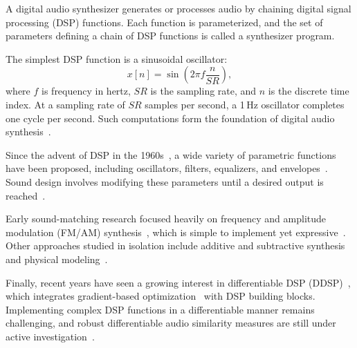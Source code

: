 A digital audio synthesizer generates or processes audio by chaining digital signal processing (\gls{DSP}) functions. 
Each function is parameterized, and the set of parameters defining a chain of DSP functions is called a synthesizer program. 

The simplest DSP function is a sinusoidal oscillator: 
\[
x[n] = \sin\!\left(2 \pi f \frac{n}{SR}\right),
\]
where $f$ is frequency in hertz, $SR$ is the sampling rate, and $n$ is the discrete time index. 
At a sampling rate of $SR$ samples per second, a 1\,Hz oscillator completes one cycle per second. 
Such computations form the foundation of digital audio synthesis~\cite{lyons1997understanding}. 

Since the advent of DSP in the 1960s~\cite{stranneby2004digital}, a wide variety of parametric functions have been proposed, including oscillators, filters, equalizers, and envelopes~\cite{lyons1997understanding,russ1999sound}. 
Sound design involves modifying these parameters until a desired output is reached~\cite{roads1996computer,pinch2004analog}. 

Early sound-matching research focused heavily on frequency and amplitude modulation (\gls{FM}/\gls{AM}) synthesis~\cite{horner1993machine,mitchell2007evolutionary,vahidi2023mesostructures}, which is simple to implement yet expressive~\cite{chowning1973synthesis}. 
Other approaches studied in isolation include additive and subtractive synthesis~\cite{engel2020ddsp,masuda2023improving,salimi2020make} and physical modeling~\cite{riionheimo2003parameter,han2024learning}. 


Finally, recent years have seen a growing interest in differentiable DSP (\gls{DDSP})~\cite{engel2020ddsp}, which integrates gradient-based optimization~\cite{goodfellow2016deep,boyd2004convex} with DSP building blocks. 
Implementing complex DSP functions in a differentiable manner remains challenging, and robust differentiable audio similarity measures are still under active investigation~\cite{masuda2021soundmatch,vahidi2023mesostructures,uzrad2024diffmoog}.


